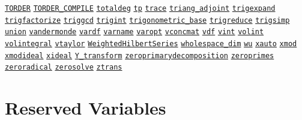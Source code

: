 \begin{list}{}
\hyperlink{operator:TORDER}{\texttt{TORDER}}
\hyperlink{operator:TORDER_COMPILE}{\texttt{TORDER\_COMPILE}}
\hyperlink{operator:TOTALDEG}{\texttt{totaldeg}}
\hyperlink{operator:TP}{\texttt{tp}}
\hyperlink{operator:TRACE}{\texttt{trace}}
\hyperlink{operator:TRIANG_ADJOINT}{\texttt{triang\_adjoint}}
\hyperlink{operator:TRIGEXPAND}{\texttt{trigexpand}}
\hyperlink{operator:TRIGFACTORIZE}{\texttt{trigfactorize}}
\hyperlink{operator:TRIGGCD}{\texttt{triggcd}}
\hyperlink{operator:TRIGINT}{\texttt{trigint}}
\hyperlink{procedure:TRIGONOMETRIC_BASE}{\texttt{trigonometric\_base}}
\hyperlink{operator:TRIGREDUCE}{\texttt{trigreduce}}
\hyperlink{operator:TRIGSIMP}{\texttt{trigsimp}}
\hyperlink{operator:UNION}{\texttt{union}}
\hyperlink{operator:VANDERMONDE}{\texttt{vandermonde}}
\hyperlink{operator:VARDF}{\texttt{vardf}}
\hyperlink{operator:VARNAME}{\texttt{varname}}
\hyperlink{operator:VAROPT}{\texttt{varopt}}
\hyperlink{operator:VCONCMAT}{\texttt{vconcmat}}
\hyperlink{operator:VDF}{\texttt{vdf}}
\hyperlink{operator:VINT}{\texttt{vint}}
\hyperlink{operator:VOLINT}{\texttt{volint}}
\hyperlink{operator:VOLINTEGRAL}{\texttt{volintegral}}
\hyperlink{operator:VTAYLOR}{\texttt{vtaylor}}
\hyperlink{operator:WEIGHTEDHILBERTSERIES}{\texttt{WeightedHilbertSeries}}
\hyperlink{operator:WHOLESPACE_DIM}{\texttt{wholespace\_dim}}
\hyperlink{operator:WU}{\texttt{wu}}
\hyperlink{operator:XAUTO}{\texttt{xauto}}
\hyperlink{operator:XMOD}{\texttt{xmod}}
\hyperlink{operator:XMODIDEAL}{\texttt{xmodideal}}
\hyperlink{operator:XIDEAL}{\texttt{xideal}}
\hyperlink{operator:Y_TRANSFORM}{\texttt{Y\_transform}}
\hyperlink{operator:ZEROPRIMARYDECOMPOSITION}{\texttt{zeroprimarydecomposition}}
\hyperlink{operator:ZEROPRIMES}{\texttt{zeroprimes}}
\hyperlink{operator:ZERORADICAL}{\texttt{zeroradical}}
\hyperlink{operator:ZEROSOLVE}{\texttt{zerosolve}}
\hyperlink{operator:ZTRANS}{\texttt{ztrans}}
\halfinterwordspace

\section{Reserved Variables}


\end{list}
